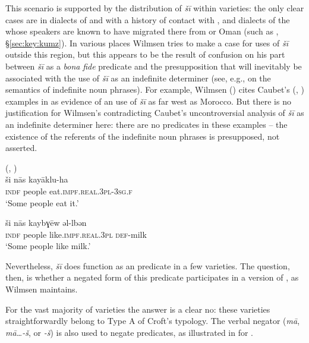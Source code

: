 \documentclass[output=paper]{langsci/langscibook}
\begin{document}
This scenario is supported by the distribution of  \textit{šī} within  varieties: the only clear cases are in dialects of  and  with a history of contact with , and dialects of the  whose speakers are known to have migrated there from  or Oman (such as , §\ref{sec:key:kumz}). In various places Wilmsen tries to make a case for  uses of \textit{šī} outside this region, but this appears to be the result of confusion on his part between \textit{šī} as a \textit{bona} \textit{fide}  predicate and the  presupposition that will inevitably be associated with the use of \textit{šī} as an indefinite determiner (see, e.g., \citealt{Heim1988} on the semantics of indefinite noun phrases). For example, Wilmsen (\citeyear[123]{Wilmsen2014}) cites Caubet’s (\citeyear[123]{Caubet1993a}, \citeyear[280]{Caubet1993b})   examples in  as evidence of an  use of \textit{šī} as far west as Morocco. But there is no justification for Wilmsen’s contradicting Caubet’s uncontroversial analysis of \textit{šī} as an indefinite determiner here: there are no  predicates in these examples – the existence of the referents of the indefinite noun phrases is presupposed, not asserted.

\ea\label{mor}
{  (\citealt[123]{Caubet1993a}, \citealt[280]{Caubet1993b})}\\
\ea\gll ši nās kayāklu-ha\\
     \textsc{indf} people eat.\textsc{impf.real.3pl-3sg.f}  \\
\glt ‘Some people eat it.’

\ex
\gll ši nās kaybɣēw əl-lbən\\
     \textsc{indf} people like.\textsc{impf.real.3pl} \textsc{def-}milk\\
\glt  ‘Some people like milk.’
\z
\z

Nevertheless, \textit{šī} does function as an  predicate in a few  varieties. The question, then, is whether a negated form of this predicate participates in a version of , as Wilmsen maintains.

For the vast majority of  varieties the answer is a clear no: these varieties straightforwardly belong to Type A of Croft’s typology. The verbal negator (\textit{mā}, \textit{mā…-š}, or \textit{{}-š}) is also used to negate  predicates, as illustrated in  for  .
\end{document}
